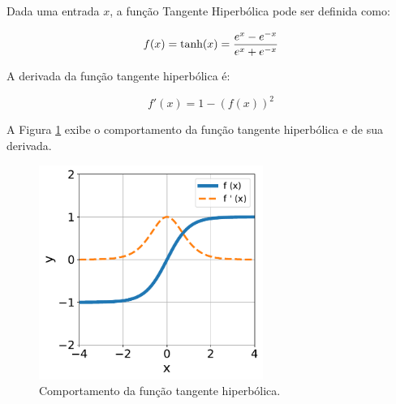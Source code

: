 \linebreak
\newpage


\begin{definition}
    Dada uma entrada $x$, a função Tangente Hiperbólica pode ser definida como:

    \begin{equation}
        f(x) = \text{tanh}(x) = \dfrac{e^{x} - e^{-x}}{e^{x} + e^{-x}}
        \vspace{0.2cm}
        \label{eq:ann_tanh_function}
    \end{equation}

    A derivada da função tangente hiperbólica é:

    \begin{equation}
        f'(x) = 1 - (f(x))^{2}
        \label{eq:ann_tanh_function_dy}
    \end{equation}

\end{definition}

A Figura \ref{fig:ann_tanh_function} exibe o comportamento da função tangente hiperbólica e de sua derivada.

\begin{figure}[H]
    \centering
    \includegraphics[width=0.65\textwidth]{figs/ann_tanh_function.pdf}

    \caption{Comportamento da função tangente hiperbólica.}
    \label{fig:ann_tanh_function}
\end{figure}










